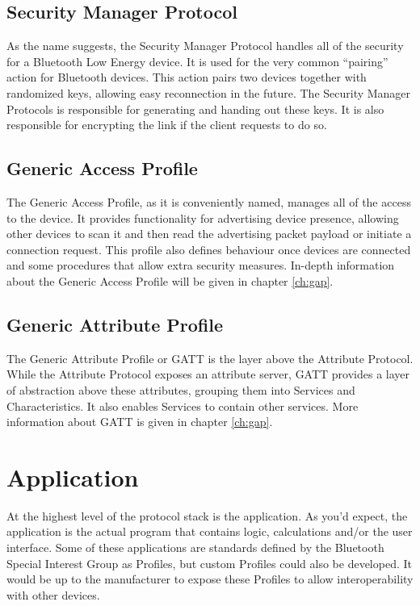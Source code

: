 \documentclass[pdftex,a4paper,12pt,twoside]{report}
\begin{document}
\subsection{Security Manager Protocol}
\label{subsec:hostSMP}
As the name suggests, the Security Manager Protocol handles all of the security for a Bluetooth Low Energy device. It is used for the very common ``pairing'' action for Bluetooth devices. This action pairs two devices together with randomized keys, allowing easy reconnection in the future. The Security Manager Protocols is responsible for generating and handing out these keys. It is also responsible for encrypting the link if the client requests to do so.

\subsection{Generic Access Profile}
\label{subsec:hostGAP}
The Generic Access Profile, as it is conveniently named, manages all of the access to the device. It provides functionality for advertising device presence, allowing other devices to scan it and then read the advertising packet payload or initiate a connection request. This profile also defines behaviour once devices are connected and some procedures that allow extra security measures. In-depth information about the Generic Access Profile will be given in chapter \ref{ch:gap}.

\subsection{Generic Attribute Profile}
\label{subsec:hostGATT}
The Generic Attribute Profile or GATT is the layer above the Attribute Protocol. While the Attribute Protocol exposes an attribute server, GATT provides a layer of abstraction above these attributes, grouping them into Services and Characteristics. It also enables Services to contain other services. More information about GATT is given in chapter \ref{ch:gap}.

\section{Application}
\label{sec:stackApplication}
At the highest level of the protocol stack is the application. As you'd expect, the application is the actual program that contains logic, calculations and/or the user interface. Some of these applications are standards defined by the Bluetooth Special Interest Group as Profiles, but custom Profiles could also be developed. It would be up to the manufacturer to expose these Profiles to allow interoperability with other devices.
\end{document}
